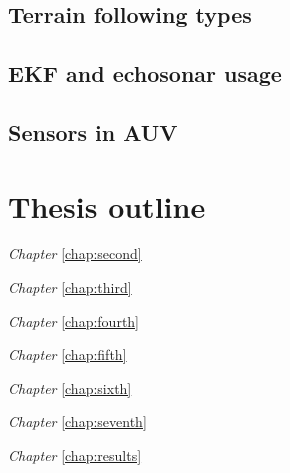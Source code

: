 \subsection{Terrain following types} 
\subsection{EKF and echosonar usage}
\subsection{Sensors in AUV}

\section{Thesis outline}
\emph{Chapter} \ref{chap:second} 

\emph{Chapter} \ref{chap:third} 

\emph{Chapter} \ref{chap:fourth} 

\emph{Chapter} \ref{chap:fifth} 

\emph{Chapter} \ref{chap:sixth} 

\emph{Chapter} \ref{chap:seventh} 

\emph{Chapter} \ref{chap:results} 

